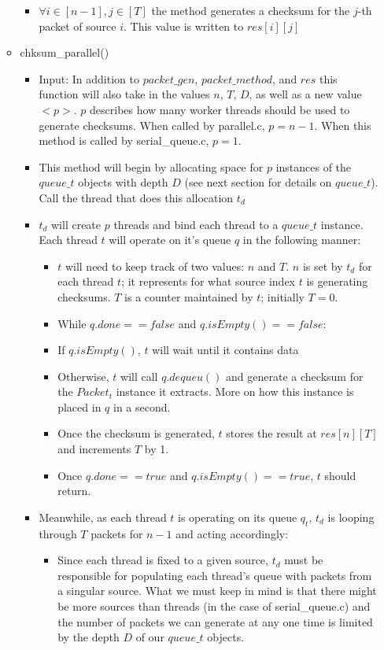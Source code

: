 \documentclass[]{article}
\begin{document}
\begin{itemize}
\begin{itemize}
\begin{itemize}
			\item $\forall i \in [n - 1], j \in [T]$ the method generates a checksum for the $j$-th packet of source $i$. This value is written to $res[i][j]$
		\end{itemize}
		\item chksum\_parallel()
		\begin{itemize}
			\item Input: In addition to $packet\_gen$, $packet\_method$, and $res$ this function will also take in the values $n$, $T$, $D$, as well as a new value $<p>$. $p$ describes how many worker threads should be used to generate checksums. When called by parallel.c, $p = n - 1$. When this method is called by serial\_queue.c, $p = 1$.
			\item This method will begin by allocating space for $p$ instances of the $queue\_t$ objects with depth $D$ (see next section for details on $queue\_t$). Call the thread that does this allocation $t_d$
			\item $t_d$ will create $p$ threads and bind each thread to a $queue\_t$ instance. Each thread $t$ will operate on it's queue $q$ in the following manner:
			\begin{itemize}
				\item $t$ will need to keep track of two values: $n$ and $T$. $n$ is set by $t_d$ for each thread $t$; it represents for what source index $t$ is generating checksums. $T$ is a counter maintained by $t$; initially $T = 0$.
				\item While $q.done == false$ and $q.isEmpty() == false$:
				\item If $q.isEmpty()$, $t$ will wait until it contains data
				\item Otherwise, $t$ will call $q.dequeu()$ and generate a checksum for the $Packet_t$ instance it extracts. More on how this instance is placed in $q$ in a second.
				\item Once the checksum is generated, $t$ stores the result at $res[n][T]$ and increments $T$ by 1.
				\item Once $q.done == true$ and $q.isEmpty() == true$, $t$ should return.
			\end{itemize}
			\item Meanwhile, as each thread $t$ is operating on its queue $q_t$, $t_d$ is looping through $T$ packets for $n - 1$ and acting accordingly:
			\begin{itemize}
				\item Since each thread is fixed to a given source, $t_d$ must be responsible for populating each thread's queue with packets from a singular source. What we must keep in mind is that there might be more sources than threads (in the case of serial\_queue.c) and the number of packets we can generate at any one time is limited by the depth $D$ of our $queue\_t$ objects.

\end{itemize}
\end{itemize}
\end{itemize}
\end{itemize}
\end{document}
